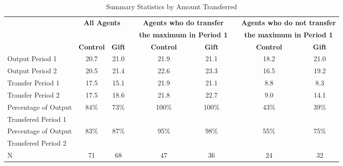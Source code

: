 \begin{table}[h]%
\setlength\tabcolsep{2pt}\caption{Summary Statistics by Amount Transferred}
\label{tab:TransferStats}
\begin{center}%
{\small\renewcommand{\arraystretch}{1}%
\begin{tabular}{lcccccccc}
\hline\hline\noalign{\smallskip}
 \bf                   & \multicolumn{2}{c}{\bf All Agents} && \multicolumn{2}{c}{\bf Agents who do transfer} && \multicolumn{2}{c}{\bf Agents who do not transfer} \\
                               & \multicolumn{2}{c}{} && \multicolumn{2}{c}{\bf the maximum in Period 1} && \multicolumn{2}{c}{\bf the maximum in Period 1} \\
\cline{2-3} \cline{5-6} \cline{8-9}
                               & \bf Control & \bf Gift && \bf \hspace{15pt} Control & \bf Gift && \hspace{15pt}  \bf Control & \bf Gift \\\hline
\noalign{\smallskip}
Output Period 1 & 20.7 & 21.0 && \hspace{15pt} 21.9 & 21.1 && \hspace{15pt} 18.2 & 21.0 \\
Output Period 2 & 20.5 & 21.4 && \hspace{15pt} 22.6 & 23.3 && \hspace{15pt} 16.5 & 19.2 \\
Transfer Period 1 & 17.5 & 15.1 && \hspace{15pt} 21.9 & 21.1 && \hspace{15pt}  8.8 &  8.3 \\
Transfer Period 2 & 17.5 & 18.6 && \hspace{15pt} 21.8 & 22.7 && \hspace{15pt}  9.0 & 14.1 \\
Percentage of Output  &   84\% &   73\% && \hspace{15pt}  100\% &  100\% && \hspace{15pt}   43\% &   39\% \\
 Transfered Period 1 & \\
Percentage of Output  &   83\% &   87\% && \hspace{15pt}   95\% &   98\% && \hspace{15pt}   55\% &   75\% \\
 Transfered Period 2 & \\
N &   71 &   68 && \hspace{15pt}   47 &   36 && \hspace{15pt}   24 &   32 \\

\end{tabular}}
\end{center}
\end{table}
